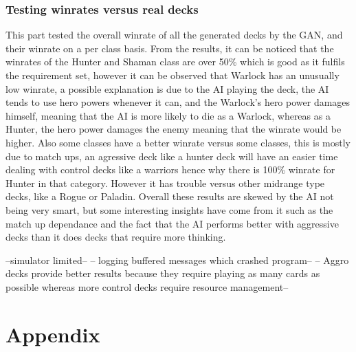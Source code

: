 \documentclass{report} %
\begin{document}
\subsection{Testing winrates versus real decks}
This part tested the overall winrate of all the generated decks by the GAN, and their winrate on a per class basis. From the results, it can be noticed that the winrates of the Hunter and Shaman class are over 50\% which is good as it fulfils the requirement set, however it can be observed that Warlock has an unusually low winrate, a possible explanation is due to the AI playing the deck, the AI tends to use hero powers whenever it can, and the Warlock's hero power damages himself, meaning that the AI is more likely to die as a Warlock, whereas as a Hunter, the hero power damages the enemy meaning that the winrate would be higher. Also some classes have a better winrate versus some classes, this is mostly due to match ups, an agressive deck like a hunter deck will have an easier time dealing with control decks like a warriors hence why there is 100\% winrate for Hunter in that category. However it has trouble versus other midrange type decks, like a Rogue or Paladin. Overall these results are skewed by the AI not being very smart, but some interesting insights have come from it such as the match up dependance and the fact that the AI performs better with aggressive decks than it does decks that require more thinking. 



--simulator limited--
-- logging buffered messages which crashed program--
-- Aggro decks provide better results because they require playing as many cards as possible whereas more control decks require resource management--


\chapter{Appendix}
\end{document}
